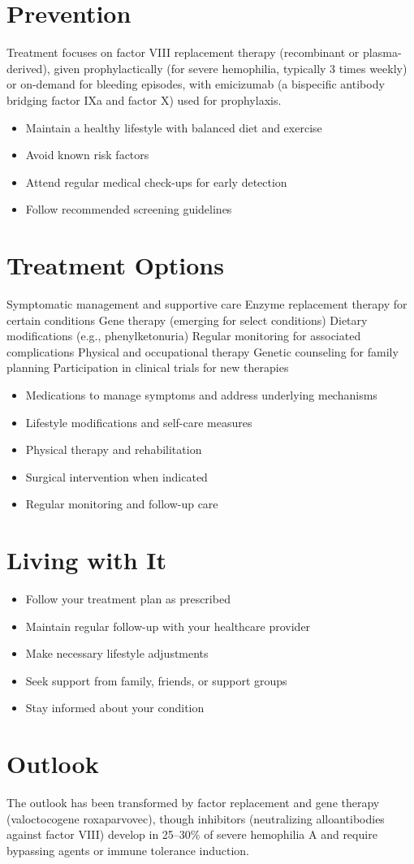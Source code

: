 \section{Prevention}
Treatment focuses on factor VIII replacement therapy (recombinant or plasma-derived), given prophylactically (for severe hemophilia, typically 3 times weekly) or on-demand for bleeding episodes, with emicizumab (a bispecific antibody bridging factor IXa and factor X) used for prophylaxis.

\begin{itemize}[noitemsep]
  \item Maintain a healthy lifestyle with balanced diet and exercise
  \item Avoid known risk factors
  \item Attend regular medical check-ups for early detection
  \item Follow recommended screening guidelines
\end{itemize}
\section{Treatment Options}
Symptomatic management and supportive care Enzyme replacement therapy for certain conditions Gene therapy (emerging for select conditions) Dietary modifications (e.g., phenylketonuria) Regular monitoring for associated complications Physical and occupational therapy Genetic counseling for family planning Participation in clinical trials for new therapies

\begin{itemize}[noitemsep]
  \item Medications to manage symptoms and address underlying mechanisms
  \item Lifestyle modifications and self-care measures
  \item Physical therapy and rehabilitation
  \item Surgical intervention when indicated
  \item Regular monitoring and follow-up care
\end{itemize}
\section{Living with It}
\begin{itemize}[noitemsep]
  \item Follow your treatment plan as prescribed
  \item Maintain regular follow-up with your healthcare provider
  \item Make necessary lifestyle adjustments
  \item Seek support from family, friends, or support groups
  \item Stay informed about your condition
\end{itemize}
\section{Outlook}
The outlook has been transformed by factor replacement and gene therapy (valoctocogene roxaparvovec), though inhibitors (neutralizing alloantibodies against factor VIII) develop in 25--30\% of severe hemophilia A and require bypassing agents or immune tolerance induction.

